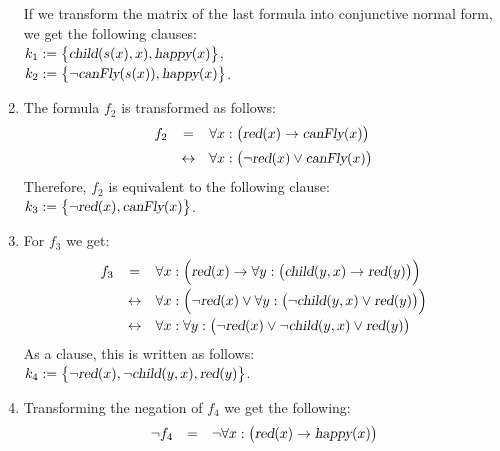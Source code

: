 \begin{enumerate}
      If we transform the matrix of the last formula into conjunctive normal form, we get the following
      clauses: 
      \\[0.2cm]
      \hspace*{1.3cm} $k_1 := \bigl\{ \textsl{child}(s(x),x), \textsl{happy}(x) \bigl\}$,   \\[0.2cm]
      \hspace*{1.3cm} $k_2 := \bigl\{ \neg \textsl{canFly}(s(x)), \textsl{happy}(x) \bigl\}$. 
\item The formula $f_2$ is transformed as follows:
 $$
        \begin{array}{lcl}
            f_2 & =  & \forall x: \bigl(\textsl{red}(x) \rightarrow \textsl{canFly}(x) \bigr) \\[0.2cm]
            & \leftrightarrow  & \forall x: \bigl(\neg \textsl{red}(x) \vee \textsl{canFly}(x) \bigr)
        \end{array}
      $$ 
      Therefore,  $f_2$ is equivalent to the following clause: \\[0.2cm]
      \hspace*{1.3cm} $k_3 := \bigl\{ \neg \textsl{red}(x), \textsl{canFly}(x) \bigl\}$.
\item For  $f_3$ we get:
      $$
        \begin{array}{lcl}
          f_3 & =          & \forall x: \Bigl(\textsl{red}(x) \rightarrow 
                             \forall y: \bigl(\textsl{child}(y,x) \rightarrow \textsl{red}(y)\bigr) \Bigr) 
          \\[0.2cm]
          &\leftrightarrow & \forall x: \Bigl(\neg \textsl{red}(x) \vee 
                             \forall y: \bigl(\neg \textsl{child}(y,x) \vee \textsl{red}(y)\bigr)\Bigr) 
          \\[0.2cm]
          &\leftrightarrow & \forall x: \forall y: \bigl(\neg \textsl{red}(x) \vee \neg \textsl{child}(y,x) \vee \textsl{red}(y)\bigr)
        \end{array}
      $$
      As a clause, this is written as follows: \\[0.2cm]
      \hspace*{1.3cm} $ k_4 := \bigl\{ \neg \textsl{red}(x), \neg \textsl{child}(y,x), \textsl{red}(y)\bigl\}$.
\item Transforming the negation of  $f_4$ we get the following:
 $$
        \begin{array}{lcl}
\neg f_4 & =      & \neg \forall x: \bigl(\textsl{red}(x) \rightarrow \textsl{happy}(x)\bigr) 
         \\[0.2cm]

\end{array}$$
\end{enumerate}
